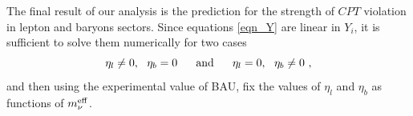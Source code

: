 \documentclass[12pt]{revtex4}
\newcommand{\lgr}{\left\lgroup}
\newcommand{\rgr}{\right\rgroup}
\newcommand{\meff}{m^{\rm eff}_\nu}
\newcommand{\GeV}{{\rm GeV}}
\begin{document}
%
%
		





The final result of our analysis is the prediction for the 
strength of $CPT$ violation in lepton and baryons sectors. 
Since equations \eqref{eqn_Y} are linear in $ Y_i $,
	it is sufficient to solve them numerically for two cases
\[
	\eta_l \neq 0,~~\eta_b = 0~~~~~ {\rm and}~~~~~ \eta_l = 0,~~\eta_b \neq 0~,
\]
	and then using the experimental value of BAU, fix the values of $ \eta_l $ and $ \eta_b $ 
	as  functions of $\meff$. 
	
\end{document}
